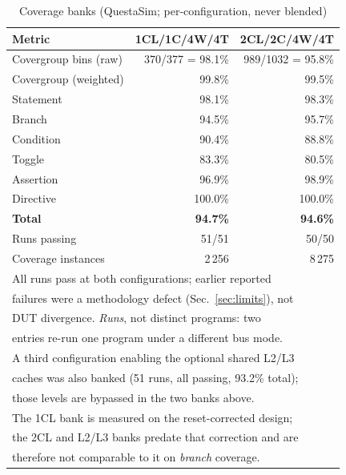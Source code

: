\documentclass[conference]{IEEEtran}
\begin{document}
\begin{table}[t]
\caption{Coverage banks (QuestaSim; per-configuration, never blended)}
\label{tab:coverage}
\centering
\small
\begin{tabular}{lrr}
\toprule
Metric & 1CL/1C/4W/4T & 2CL/2C/4W/4T \\
\midrule
Covergroup bins (raw) & 370/377 = 98.1\% & 989/1032 = 95.8\% \\
Covergroup (weighted) & 99.8\% & 99.5\% \\
Statement & 98.1\% & 98.3\% \\
Branch & 94.5\% & 95.7\% \\
Condition & 90.4\% & 88.8\% \\
Toggle & 83.3\% & 80.5\% \\
Assertion & 96.9\% & 98.9\% \\
Directive & 100.0\% & 100.0\% \\
\midrule
\textbf{Total} & \textbf{94.7\%} & \textbf{94.6\%} \\
Runs passing & 51/51 & 50/50 \\
Coverage instances & 2\,256 & 8\,275 \\
\bottomrule
\multicolumn{3}{l}{\footnotesize All runs pass at both configurations;
earlier reported} \\
\multicolumn{3}{l}{\footnotesize failures were a methodology defect
(Sec.~\ref{sec:limits}), not} \\
\multicolumn{3}{l}{\footnotesize DUT divergence. \emph{Runs}, not distinct
programs: two} \\
\multicolumn{3}{l}{\footnotesize entries re-run one program under a
different bus mode.} \\
\multicolumn{3}{l}{\footnotesize A third configuration enabling the optional
shared L2/L3} \\
\multicolumn{3}{l}{\footnotesize caches was also banked (51 runs, all passing,
93.2\% total);} \\
\multicolumn{3}{l}{\footnotesize those levels are bypassed in the two banks
above.} \\
\multicolumn{3}{l}{\footnotesize The 1CL bank is measured on the
reset-corrected design;} \\
\multicolumn{3}{l}{\footnotesize the 2CL and L2/L3 banks predate that
correction and are} \\
\multicolumn{3}{l}{\footnotesize therefore not comparable to it on
\emph{branch} coverage.}
\end{tabular}
\end{table}
\end{document}
